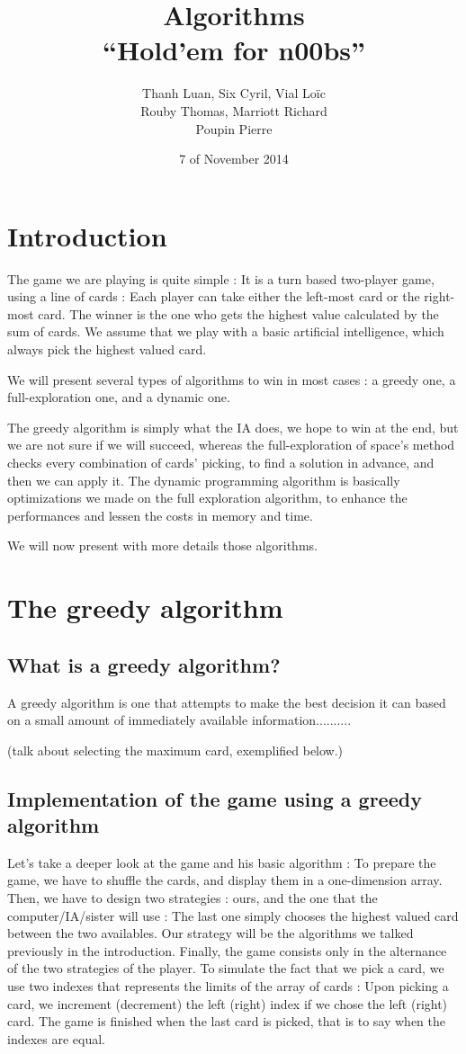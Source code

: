 \documentclass[11pt]{article}
\title{Algorithms \\
	\textbf{``Hold'em for n00bs''}}
\author{Thanh Luan, Six Cyril, Vial Loïc \\
			Rouby Thomas, Marriott Richard\\
			Poupin Pierre}
\date{7\up{th} of November 2014}
\begin{document}
\maketitle

\section{Introduction}
The game we are playing is quite simple : It is a turn based two-player game, using a line of cards : Each player can take either the left-most card or the right-most card.
The winner is the one who gets the highest value calculated by the sum of cards.
We assume that we play with a basic artificial intelligence, which always pick the highest valued card.

We will present several types of algorithms to win in most cases : a greedy one, a full-exploration one, and a dynamic one.

The greedy algorithm is simply what the IA does, we hope to win at the end, but we are not sure if we will succeed, whereas the full-exploration of space's method checks every combination of cards' picking, to find a solution in advance, and then we can apply it.
The dynamic programming algorithm is basically optimizations we made on the full exploration algorithm, to enhance the performances and lessen the costs in memory and time.

We will now present with more details those algorithms.


\section{The greedy algorithm}
\subsection{What is a greedy algorithm?}

A greedy algorithm is one that attempts to make the best decision it can based on a small amount of immediately available information..........

(talk about selecting the maximum card, exemplified below.)

\subsection{Implementation of the game using a greedy algorithm}
Let's take a deeper look at the game and his basic algorithm :
To prepare the game, we have to shuffle the cards, and display them in a one-dimension array.
Then, we have to design two strategies : ours, and the one that the computer/IA/sister will use : The last one simply chooses the highest valued card between the two availables.
Our strategy will be the algorithms we talked previously in the introduction.
Finally, the game consists only in the alternance of the two strategies of the player.
To simulate the fact that we pick a card, we use two indexes that represents the limits of the array of cards : Upon picking a card, we increment (decrement) the left (right) index if we chose the left (right) card. The game is finished when the last card is picked, that is to say when the indexes are equal.
\end{document}
